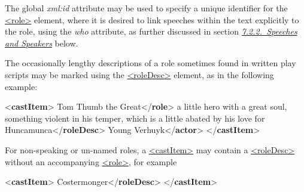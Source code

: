 The global {\itshape xml:id} attribute may be used to specify a unique identifier for the \hyperref[TEI.role]{<role>} element, where it is desired to link speeches within the text explicitly to the role, using the {\itshape who} attribute, as further discussed in section \textit{\hyperref[DRSP]{7.2.2.\ Speeches and Speakers}} below.\par
The occasionally lengthy descriptions of a role sometimes found in written play scripts may be marked using the \hyperref[TEI.roleDesc]{<roleDesc>} element, as in the following example: \par\bgroup{}\exampleFont \begin{shaded}\noindent\mbox{}{<\textbf{castItem}>}\mbox{}\newline 
{}Tom Thumb the Great{</\textbf{role}>}\mbox{}\newline 
{}a little hero with a great soul, something violent in his\mbox{}\newline 
\hspace*{1em}\hspace*{1em} temper, which is a little abated by his love for Huncamunca{</\textbf{roleDesc}>}\mbox{}\newline 
{}Young Verhuyk{</\textbf{actor}>}\mbox{}\newline 
{</\textbf{castItem}>}\end{shaded}\egroup\par \noindent   For non-speaking or un-named roles, a \hyperref[TEI.castItem]{<castItem>} may contain a \hyperref[TEI.roleDesc]{<roleDesc>} without an accompanying \hyperref[TEI.role]{<role>}, for example \par\bgroup{}\exampleFont \begin{shaded}\noindent\mbox{}{<\textbf{castItem}>}\mbox{}\newline 
{}Costermonger{</\textbf{roleDesc}>}\mbox{}\newline 
{</\textbf{castItem}>}\end{shaded}\egroup\par \par
